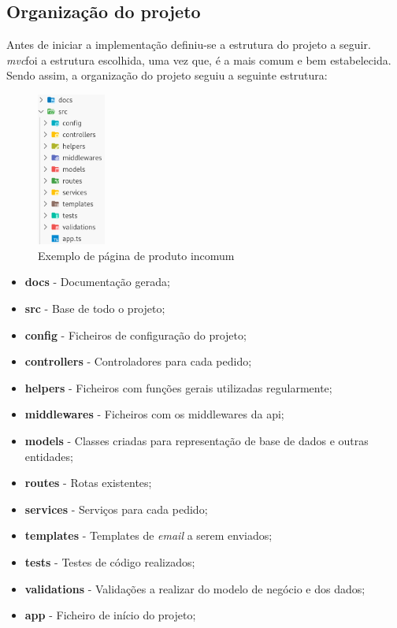 \subsection{Organização do projeto}
Antes de iniciar a implementação definiu-se a estrutura do projeto a seguir. \textit{\acrshort{mvc}}foi a estrutura escolhida, uma vez que, é a mais comum e bem estabelecida. Sendo assim, a organização do projeto seguiu a seguinte estrutura:
\begin{figure}[htb]
 \centering
 \includegraphics[width=0.2\textwidth]{images/implementacao/api/project_organization.png}
 \caption{Exemplo de página de produto incomum}
 \label{fig:63}
\end{figure}

\begin{itemize}
 \item \textbf{docs} - Documentação gerada;
 \item \textbf{src} - Base de todo o projeto;
 \item \textbf{config} - Ficheiros de configuração do projeto;
 \item \textbf{controllers} - Controladores para cada pedido;
 \item \textbf{helpers} - Ficheiros com funções gerais utilizadas regularmente;
 \item \textbf{middlewares} - Ficheiros com os middlewares da api;
 \item \textbf{models} - Classes criadas para representação de base de dados e outras entidades;
 \item \textbf{routes} - Rotas existentes;
 \item \textbf{services} - Serviços para cada pedido;
 \item \textbf{templates} - Templates de \textit{email} a serem enviados;
 \item \textbf{tests} - Testes de código realizados;
 \item \textbf{validations} - Validações a realizar do modelo de negócio e dos dados;
 \item \textbf{app} - Ficheiro de início do projeto;
\end{itemize}